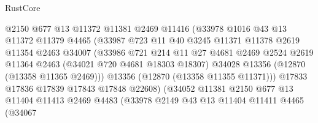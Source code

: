 \begin{lexlean}{RustCore}
\begin{coremodule}
                              @2150
                              @677
                              @13
                              @11372
                              @11381
                              @2469
                              @11416
                              (@33978
                                @1016
                                @43
                                @13
                                @11372
                                @11379
                                @4465
                                (@33987
                                  @723
                                  @11
                                  @40
                                  @3245
                                  @11371
                                  @11378
                                  @2619
                                  @11354
                                  @2463
                                  @34007
                                  (@33986
                                    @721
                                    @214
                                    @11
                                    @27
                                    @4681
                                    @2469
                                    @2524
                                    @2619
                                    @11364
                                    @2463
                                    (@34021 @720 @4681 @18303 @18307)
                                    @34028
                                    @13356
                                    (@12870 (@13358 @11365 @2469)))
                                  @13356
                                  (@12870 (@13358 @11355 @11371)))
                                @17833
                                @17836
                                @17839
                                @17843
                                @17848
                                @22608)
                              (@34052
                                @11381
                                @2150
                                @677
                                @13
                                @11404
                                @11413
                                @2469
                                @4483
                                (@33978
                                  @2149
                                  @43
                                  @13
                                  @11404
                                  @11411
                                  @4465
                                  (@34067

\end{coremodule}
\end{lexlean}
